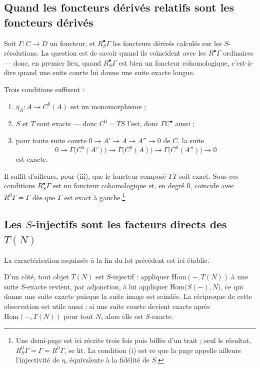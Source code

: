 \documentclass[11pt,a4paper]{article}
\begin{document}
\subsection*{Quand les foncteurs dérivés relatifs sont les foncteurs dérivés}

Soit $\Gamma : C \to D$ un foncteur, et $R_{S}^{\bullet}\Gamma$ les foncteurs
dérivés calculés sur les $S$-résolutions. La question est de savoir quand ils
coïncident avec les $R^{\bullet}\Gamma$ ordinaires — donc, en premier lieu,
quand $R_{S}^{\bullet}\Gamma$ est bien un foncteur cohomologique, c'est-à-dire
quand une suite courte lui donne une suite exacte longue.

Trois conditions suffisent :

\begin{enumerate}
\item[(i)] $\eta_{A} : A \to C^{0}(A)$ est un monomorphisme ;
\item[(ii)] $S$ et $T$ sont exacts — donc $C^{0} = TS$ l'est, donc
$\Gamma C^{\bullet}$ aussi ;
\item[(iii)] pour toute suite courte $0 \to A' \to A \to A'' \to 0$ de $C$, la
suite
\[
  0 \longrightarrow \Gamma\bigl( C^{0}(A') \bigr) \longrightarrow
  \Gamma\bigl( C^{0}(A) \bigr) \longrightarrow
  \Gamma\bigl( C^{0}(A'') \bigr) \longrightarrow 0
\]
est exacte.
\end{enumerate}

Il suffit d'ailleurs, pour (iii), que le foncteur composé $\Gamma T$ soit
exact. Sous ces conditions $R_{S}^{\bullet}\Gamma$ est un foncteur
cohomologique et, en degré $0$, coïncide avec $R^{0}\Gamma = \Gamma$ dès que
$\Gamma$ est exact à gauche.\footnote{Une demi-page est ici récrite trois fois
puis biffée d'un trait ; seul le résultat, $R_{S}^{0}\Gamma = \Gamma =
R^{0}\Gamma$, se lit. La condition (i) est ce que la page appelle ailleurs
l'injectivité de $\eta$, équivalente à la fidélité de $S$.}

\subsection*{Les $S$-injectifs sont les facteurs directs des $T(N)$}

La caractérisation esquissée à la fin du lot précédent est ici établie.

D'un côté, tout objet $T(N)$ est $S$-injectif : appliquer $\mathrm{Hom}(-,
T(N))$ à une suite $S$-exacte revient, par adjonction, à lui appliquer
$\mathrm{Hom}\bigl( S(-), N \bigr)$, ce qui donne une suite exacte puisque la
suite image est scindée. La réciproque de cette observation est utile aussi :
si une suite courte devient exacte après $\mathrm{Hom}(-, T(N))$ pour tout $N$,
alors elle est $S$-exacte.
\end{document}
